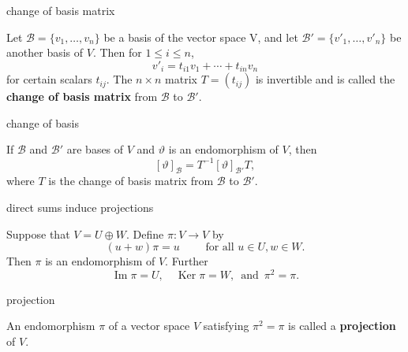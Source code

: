 \documentclass[avery5371,grid]{flashcards}
\newcommand{\B}{\mathscr{B}}
\renewcommand{\le}{\leqslant}
\renewcommand{\theta}{\vartheta}
\DeclareMathOperator{\Ker}{\ensuremath{\textrm{Ker}}}
\DeclareMathOperator{\Img}{\ensuremath{\textrm{Im}}}
\newcommand{\defn}[1]{\textbf{#1}}
\begin{document}
\begin{flashcard}[Definition]{change of basis matrix}

  Let $\B = \{v_1, \ldots, v_n \}$ be a basis of the vector space V,
  and let $\B' = \{v'_1, \ldots, v'_n \}$ be another basis of $V$.
  Then for $1 \le i \le n$,
  \[
    v'_i = t_{i1} v_1 + \cdots + t_{in} v_n
  \]
  for certain scalars $t_{ij}$. The $n\times n$ matrix $T=(t_{ij})$ is
  invertible and is called the \defn{change of basis matrix} from $\B$
  to $\B'$.

\end{flashcard}

\begin{flashcard}[Theorem]{change of basis}

  If $\B$ and $\B'$ are bases of $V$ and $\theta$ is an endomorphism
  of $V$, then
  \[
    [\theta]_{\B} = T^{-1}[\theta]_{\B'}T,
  \]
  where $T$ is the change of basis matrix from $\B$ to $\B'$.

\end{flashcard}


\begin{flashcard}[Proposition]{direct sums induce projections}

  Suppose that $V = U \oplus W$. Define $\pi : V \to V$ by
  \[
    (u+w)\pi = u \qquad \text{ for all } u\in U, w \in W.
  \]
  Then $\pi$ is an endomorphism of $V$. Further
  \[
    \Img \pi = U, \quad \Ker \pi = W, \, \text{ and } \, \pi^2 = \pi.
  \]

\end{flashcard}

\begin{flashcard}[Definition]{projection}

  An endomorphism $\pi$ of a vector space $V$ satisfying $\pi^2 = \pi$
  is called a \defn{projection} of $V$.

\end{flashcard}
\end{document}
